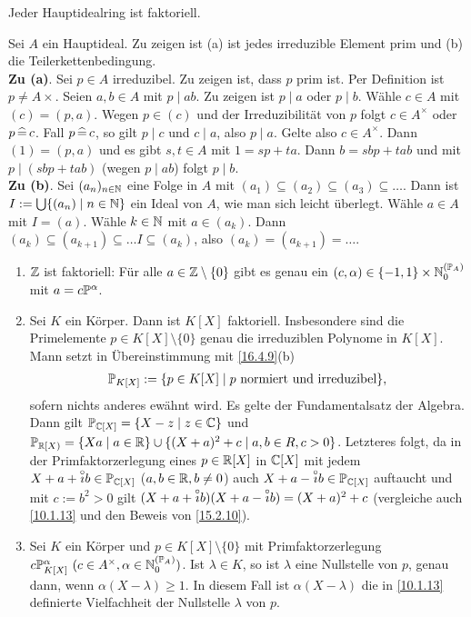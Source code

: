 \documentclass[../../main.tex]{subfiles}
\begin{document}
\begin{kor}\label{16.4.19}
Jeder Hauptidealring ist faktoriell. 
\end{kor}
\begin{cproof}
Sei $A$ ein Hauptideal. Zu zeigen ist (a) ist jedes irreduzible Element prim und (b) die Teilerkettenbedingung.\\

\noindent\textbf{Zu (a)}. Sei $p\in A$ irreduzibel. Zu zeigen ist, dass $p$ prim ist. Per Definition ist $p\neq A\times$. Seien $a,b\in A$ mit $p\mid ab$. Zu zeigen ist $p\mid a$ oder $p\mid b$. Wähle $c\in A$ mit $(c)=(p,a)$. Wegen $p\in (c)$ und der Irreduzibilität von $p$ folgt $c\in A^\times$ oder $p\divi c$. Fall $p\divi c$, so gilt $p\mid c$ und $c\mid a$, also $p\mid a$. Gelte also $c\in A^\times$. Dann $(1)=(p,a)$ und es gibt $s,t\in A$ mit $1=sp+ta$. Dann $b=sbp+tab$ und mit $p\mid(sbp+tab)$ (wegen $p\mid ab$) folgt $p\mid b$.\\

\noindent\textbf{Zu (b)}. Sei $(a_n)_{n\in \N}$ eine Folge in $A$ mit $(a_1)\subseteq (a_2)\subseteq(a_3)\subseteq\ldots $. Dann ist $I:=\bigcup\{(a_n)\mid n\in \N\}$ ein Ideal von $A$, wie man sich leicht überlegt. Wähle $a\in A$ mit $I=(a)$. Wähle $k\in \N$ mit $a\in (a_k)$. Dann $(a_k)\subseteq (a_{k+1})\subseteq\ldots  I\subseteq (a_k)$, also $(a_k)=(a_{k+1})=\ldots $.
\end{cproof}

\begin{bsp}\label{16.4.20}
\begin{enumerate}[\normalfont(a)]
\item $\Z$ ist faktoriell: Für alle $a\in\Z\setminus\{0\}$ gibt es genau ein $(c,\alpha)\in \{-1,1\}\times \N_0^{(\P_A)}$ mit $a=c\P^\alpha$.
\item Sei $K$ ein Körper. Dann ist $K[X]$ faktoriell. Insbesondere sind die Primelemente $p\in K[X]\setminus\{0\}$ genau die irreduziblen Polynome in $K[X]$. Mann setzt in Übereinstimmung mit \ref{16.4.9}(b)
\begin{align*}
\P_{K[X]}:=\{p\in K[X]\mid p\text{ normiert und irreduzibel}\},
\end{align*}
sofern nichts anderes ewähnt wird. Es gelte der Fundamentalsatz der Algebra. Dann gilt $\P_{\C[X]}=\{X-z\mid z\in \C\}$ und $\P_{\R[X)}=\{Xa\mid a\in \R\}\cup\{(X+a)^2+c\mid a,b\in R,c>0\}$. Letzteres folgt, da in der Primfaktorzerlegung eines $p\in \R[X]$ in $\C[X]$ mit jedem $X+a+\i b\in\P_{\C[X]}$ ($a,b\in\R,b\neq 0$) auch $X+a-\i b\in\P_{\C[X]}$ auftaucht und mit $c:=b^2>0$ gilt $(X+a+\i b)(X+a-\i b)=(X+a)^2+c$ (vergleiche auch \ref{10.1.13} und den Beweis von \ref{15.2.10}).
\item Sei $K$ ein Körper und $p\in K[X]\setminus\{0\}$ mit Primfaktorzerlegung $c\P_{K[X]}^\alpha\ (c\in A^\times, \alpha\in \N_0^{(\P_A)})$. Ist $\lambda\in K$, so ist $\lambda$ eine Nullstelle von $p$, genau dann, wenn $\alpha(X-\lambda)\ge 1$. In diesem Fall ist $\alpha(X-\lambda)$ die in \ref{10.1.13} definierte Vielfachheit der Nullstelle $\lambda$ von $p$.
\end{enumerate}
\end{bsp}
\end{document}
